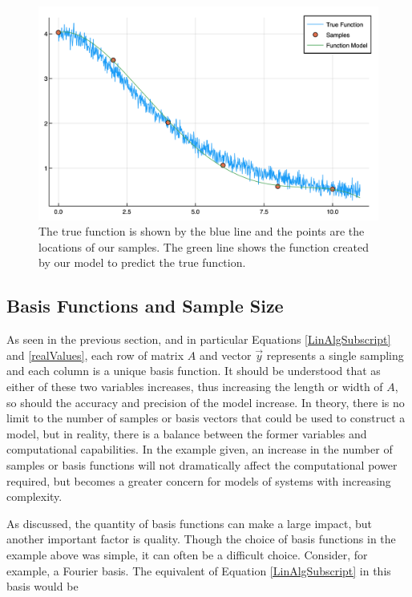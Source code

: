 \begin{figure}[h]
\includegraphics[scale = 0.4]{Figures/func1True}
\caption{The true function is shown by the blue line and the points are the locations of our samples. The green line shows the function created by our model to predict the true function.
\label{figFunc1True}} 
\end{figure}



\subsection{Basis Functions and Sample Size}\label{Sect:samplesAndFunctions}
\par As seen in the previous section, and in particular Equations \ref{LinAlgSubscript} and \ref{realValues}, each row of matrix $A$ and vector $\vec{y}$ represents a single sampling and each column is a unique basis function. It should be understood that as either of these two variables increases, thus increasing the length or width of $A$, so should the accuracy and precision of the model increase. In theory, there is no limit to the number of samples or basis vectors that could be used to construct a model, but in reality, there is a balance between the former variables and computational capabilities. In the example given, an increase in the number of samples or basis functions will not dramatically affect the computational power required, but becomes a greater concern for models of systems with increasing complexity. 
\par As discussed, the quantity of basis functions can make a large impact, but another important factor is quality. Though the choice of basis functions in the example above was simple, it can often be a difficult choice. Consider, for example, a Fourier basis. The equivalent of Equation \ref{LinAlgSubscript} in this basis would be

